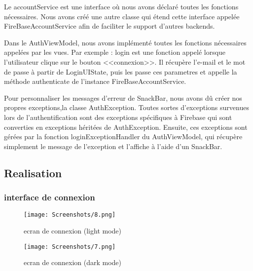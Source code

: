 Le accountService est une interface où nous avons déclaré toutes les fonctions nécessaires.
Nous avons créé une autre classe qui étend cette interface appelée FireBaseAccountService afin de faciliter le support d'autres backends.

Dans le AuthViewModel, nous avons implémenté toutes les fonctions nécessaires appelées par les vues. Par exemple : login est une fonction appelé lorsque l'utilisateur clique sur le bouton  <<connexion>>. Il récupère l'e-mail et le mot de passe à partir de LoginUIState, puis les passe ces parametres et appelle la méthode authenticate de l'instance FireBaseAccountService.

Pour personnaliser les messages d'erreur de SnackBar, nous avons dû créer nos propres exceptions,la classe AuthException. Toutes sortes d'exceptions survenues lors de l'authentification sont des exceptions spécifiques à Firebase qui sont converties en exceptions héritées de AuthException. Ensuite, ces exceptions sont gérées par la fonction loginExceptionHandler du AuthViewModel, qui récupère simplement le message de l'exception et l'affiche à l'aide d'un SnackBar.

\subsection{Realisation}
\subsubsection{interface de connexion}
\begin{figure}[!htbp]
  \begin{minipage}[t]{0.4\textwidth}    %
          \texttt{[image: Screenshots/8.png]}
          \caption{ ecran de connexion (light mode)}
  \end{minipage}%
    \begin{minipage}{0.20\textwidth}
      \hfill
    \end{minipage}
  \begin{minipage}[t]{0.4\textwidth}
          \texttt{[image: Screenshots/7.png]}
          \caption{ ecran de connexion (dark mode)}
  \end{minipage}%
  \end{figure}
  \hfill
  $ $
